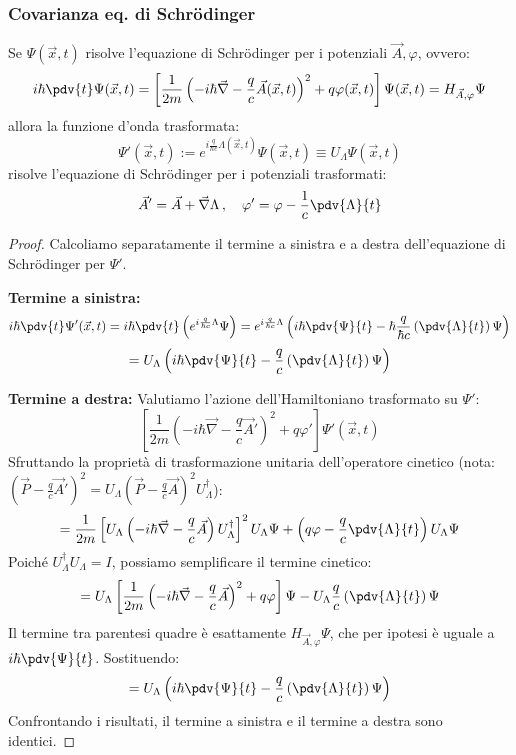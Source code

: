 \subsubsection{Covarianza eq. di Schrödinger}
Se \( \Psi(\vec{x},t) \) risolve l'equazione di Schrödinger per i potenziali \( \vec{A}, \varphi \), ovvero:
\[
i\hbar \pdv{t} \Psi(\vec{x},t) = \left[ \frac{1}{2m} \left( -i\hbar\vec{\nabla} - \frac{q}{c}\vec{A}(\vec{x},t) \right)^2 + q\varphi(\vec{x},t) \right] \Psi(\vec{x},t) = H_{\vec{A},\varphi} \Psi
\]
allora la funzione d'onda trasformata:
\[
\Psi'(\vec{x},t) := e^{i\frac{q}{\hbar c}\Lambda(\vec{x},t)} \Psi(\vec{x},t) \equiv U_{\Lambda} \Psi(\vec{x},t)
\]
risolve l'equazione di Schrödinger per i potenziali trasformati:
\[
\vec{A}' = \vec{A} + \vec{\nabla}\Lambda \,,\quad \varphi' = \varphi - \frac{1}{c}\pdv{\Lambda}{t}
\]

\begin{proof}
    Calcoliamo separatamente il termine a sinistra e a destra dell'equazione di Schrödinger per \( \Psi' \).

    \textbf{Termine a sinistra:}
    \[
    i\hbar \pdv{t} \Psi'(\vec{x},t) = i\hbar \pdv{t} \left( e^{i\frac{q}{\hbar c}\Lambda} \Psi \right)
    = e^{i\frac{q}{\hbar c}\Lambda} \left( i\hbar \pdv{\Psi}{t} - \hbar \frac{q}{\hbar c} \left(\pdv{\Lambda}{t}\right) \Psi \right)
    \]
    \[
    = U_{\Lambda} \left( i\hbar \pdv{\Psi}{t} - \frac{q}{c} \left(\pdv{\Lambda}{t}\right) \Psi \right)
    \]

    \textbf{Termine a destra:}
    Valutiamo l'azione dell'Hamiltoniano trasformato su \( \Psi' \):
    \[
    \left[ \frac{1}{2m} \left( -i\hbar\vec{\nabla} - \frac{q}{c}\vec{A}' \right)^2 + q\varphi' \right] \Psi'(\vec{x},t)
    \]
    Sfruttando la proprietà di trasformazione unitaria dell'operatore cinetico (nota: \( (\vec{P}-\frac{q}{c}\vec{A}')^2 = U_{\Lambda} (\vec{P}-\frac{q}{c}\vec{A})^2 U_{\Lambda}^{\dagger} \)):
    \[
    = \frac{1}{2m} \left[ U_{\Lambda} \left( -i\hbar\vec{\nabla} - \frac{q}{c}\vec{A} \right) U_{\Lambda}^{\dagger} \right]^2 U_{\Lambda} \Psi + \left( q\varphi - \frac{q}{c}\pdv{\Lambda}{t} \right) U_{\Lambda} \Psi
    \]
    Poiché \( U_{\Lambda}^{\dagger} U_{\Lambda} = I \), possiamo semplificare il termine cinetico:
    \[
    = U_{\Lambda} \left[ \frac{1}{2m} \left( -i\hbar\vec{\nabla} - \frac{q}{c}\vec{A} \right)^2 + q\varphi \right] \Psi - U_{\Lambda} \frac{q}{c} \left(\pdv{\Lambda}{t}\right) \Psi
    \]
    Il termine tra parentesi quadre è esattamente \( H_{\vec{A},\varphi} \Psi \), che per ipotesi è uguale a \( i\hbar \pdv{\Psi}{t} \). Sostituendo:
    \[
    = U_{\Lambda} \left( i\hbar \pdv{\Psi}{t} - \frac{q}{c} \left(\pdv{\Lambda}{t}\right) \Psi \right)
    \]
    Confrontando i risultati, il termine a sinistra e il termine a destra sono identici.
\end{proof}

